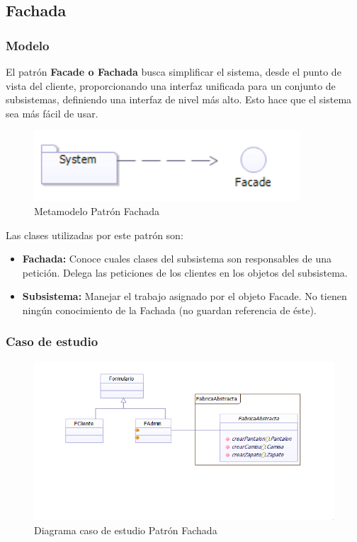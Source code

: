 \subsection{Fachada}
\subsubsection{Modelo}

El patrón \textbf{Facade o Fachada} busca simplificar el sistema, desde el punto de vista del cliente, proporcionando una interfaz unificada para un conjunto de subsistemas, definiendo una interfaz de nivel más alto. Esto hace que el sistema sea más fácil de usar.

\begin{figure}[th!]
	\centering
	\includegraphics[width=0.6\linewidth]{arquitectura/imagenes/modeloFachada}
	\caption{Metamodelo Patrón Fachada}
	\label{fig:metamodelo patron fachada}
\end{figure}


Las clases utilizadas por este patrón son:
\begin{itemize}
	\item \textbf{Fachada: }Conoce cuales clases del subsistema son responsables de una petición. Delega las peticiones de los clientes en los objetos del subsistema.
	\item \textbf{Subsistema: }Manejar el trabajo asignado por el objeto Facade. No tienen ningún conocimiento de la Fachada (no guardan referencia de éste).
\end{itemize}


\subsubsection{Caso de estudio}
\begin{figure}[h!]
	\centering
	\includegraphics[width=0.8\linewidth]{arquitectura/imagenes/DiagramaFachada}
	\caption{Diagrama caso de estudio Patrón Fachada}
\end{figure}

